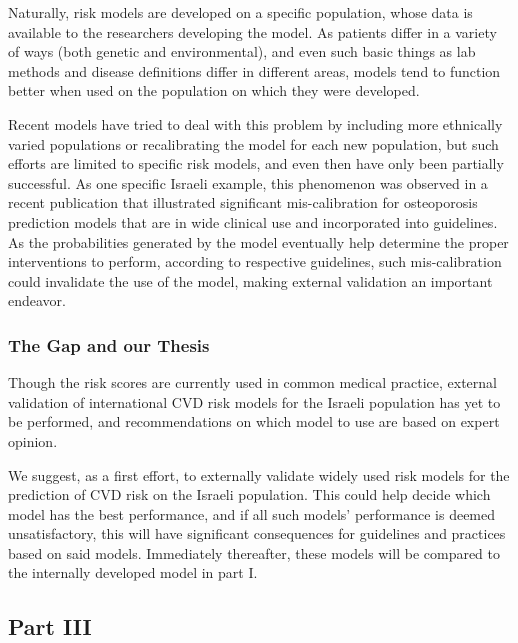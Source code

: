 \documentclass[a4paper,12pt]{article}
\begin{document}
		Naturally, risk models are developed on a specific population, whose data is available to the researchers developing the model. As patients differ in a variety of ways (both genetic and environmental), and even such basic things as lab methods and disease definitions differ in different areas, models tend to function better when used on the population on which they were developed\cite{DAgostino2001,Bastuji-Garin2002}.
		
		Recent models have tried to deal with this problem by including more ethnically varied populations\cite{DeFilippis2015} or recalibrating the model for each new population\cite{Kanis2008}, but such efforts are limited to specific risk models, and even then have only been partially successful\cite{Dagan2017}. As one specific Israeli example, this phenomenon was observed in a recent publication that illustrated significant mis-calibration for osteoporosis prediction models that are in wide clinical use and incorporated into guidelines\cite{Dagan2017}. As the probabilities generated by the model eventually help determine the proper interventions to perform, according to respective guidelines, such mis-calibration could invalidate the use of the model, making external validation an important endeavor\cite{Moons2012}.
		
		\subsubsection{The Gap and our Thesis}
		
		Though the risk scores are currently used in common medical practice, external validation of international CVD risk models for the Israeli population has yet to be performed, and recommendations on which model to use are based on expert opinion\cite{Bitzur2015}.
		
		We suggest, as a first effort, to externally validate widely used risk models for the prediction of CVD risk on the Israeli population. This could help decide which model has the best performance, and if all such models' performance is deemed unsatisfactory, this will have significant consequences for guidelines and practices based on said models. Immediately thereafter, these models will be compared to the internally developed model in part I.
		
		\subsection{Part III}
		
\end{document}
